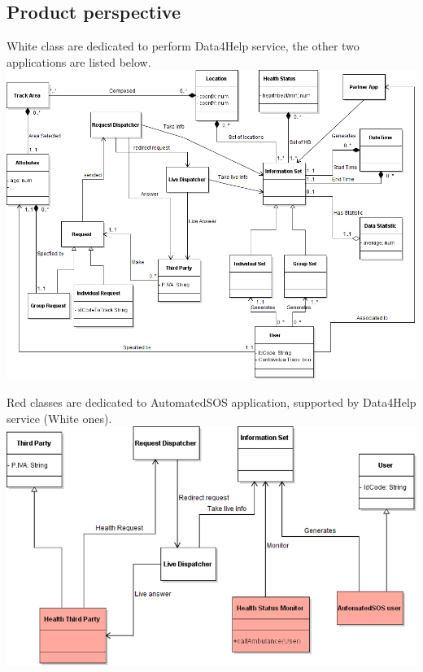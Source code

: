 
\subsection{Product perspective}


\begin{minipage}{\textwidth}
\begin{center}
\begin{center}
White class are dedicated to perform Data4Help service, the other two applications are listed below.
\includegraphics[scale=0.5]{Images/Class_Data4Help.png}
\end{center}
\end{center}

\begin{center}
{\color{Salmon} Red classes} are dedicated to {\color{Salmon} AutomatedSOS} application, supported by Data4Help service (White ones).
\includegraphics[scale=0.6]{Images/Class_AutoSOS.png}
\end{center}
\end{minipage}

